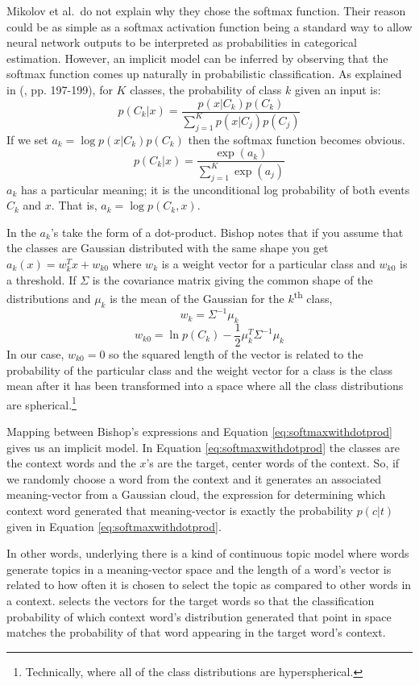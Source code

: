 Mikolov et al.\ do not explain why they chose the softmax function. Their 
reason could be as simple as a softmax activation function being a standard 
way to allow neural network outputs to be interpreted as probabilities in 
categorical estimation. However, an implicit model can be inferred by observing 
that the softmax function comes up naturally in probabilistic classification. 
As explained in (\citealt{Bishop2006a}, pp. 197-199), for $K$ classes, the 
probability of class $k$ given an input is:
%
\[
 p(C_k | x) = \frac{p(x | C_k) p(C_k)}{\sum_{j=1}^{K} p(x | C_j)p(C_j)}
\]
If we set $a_k = \log p(x | C_k) p(C_k)$ then the softmax function becomes 
obvious.
%
\[
 p(C_k | x) = \frac{ \exp(a_k) }{ \sum_{j=1}^{K} \exp(a_j)}
\]
$a_k$ has a particular meaning; it is the unconditional log probability of both 
events $C_k$ and $x$. That is, $a_k=\log p(C_k, x)$.

In \modelname{} the $a_k$'s take the form of a dot-product. Bishop notes that if 
you assume that the classes are Gaussian distributed with the same shape you get 
$a_k(x) = w_k^T x + w_{k0}$ where $w_k$ is a weight vector for a particular 
class and $w_{k0}$ is a threshold. If $\Sigma$ is the covariance matrix giving 
the common shape of the distributions and $\mu_k$ is the mean of the Gaussian 
for the $k$\textsuperscript{th} class,
%
\[
 w_k = \Sigma^{-1}\mu_k
\]
\[
 w_{k0} = \ln p(C_k)-\frac{1}{2}\mu_k^T\Sigma^{-1}\mu_k
\]
%
In our case, $w_{k0} = 0$ so the squared length of the vector is related to 
the probability of the particular class and the weight vector for a class is
the class mean after it has been transformed into a space where all 
the class distributions are spherical.\footnote{Technically, where all of the
class distributions are hyperspherical.}

Mapping between Bishop's expressions and Equation \ref{eq:softmaxwithdotprod} 
gives us an implicit model. In Equation \ref{eq:softmaxwithdotprod} the classes 
are the context words and the $x$'s are the target, center words of the context.
So, if we randomly choose a word from the context and it generates an 
associated meaning-vector from a Gaussian cloud, the expression for determining
which context word generated that meaning-vector is exactly the probability
$p(c|t)$ given in Equation \ref{eq:softmaxwithdotprod}.

In other words, underlying \modelname{} there is a kind of continuous topic 
model where words generate topics in a meaning-vector space and the length of
a word's vector is related to how often it is chosen to select the topic 
as compared to other words in a context. \modelname{} selects the vectors for 
the target words so that the classification probability of which context word's
distribution generated that point in space matches the probability of that word
appearing in the target word's context.


